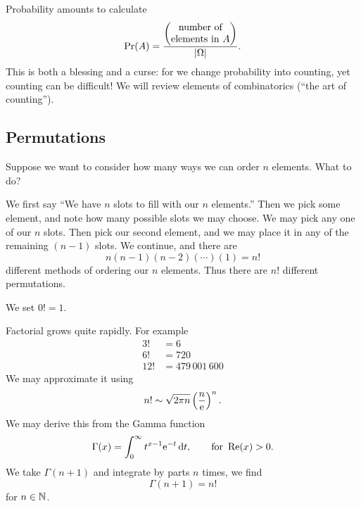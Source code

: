 \M
Probability amounts to calculate
\begin{equation}
\mathop{\mathrm{Pr}}\nolimits(A)=\frac{\begin{pmatrix}\mbox{number of}\\
\mbox{elements in $A$}
  \end{pmatrix}}{|\Omega|}.
\end{equation}
This is both a blessing and a curse: for we change probability into
counting, yet counting can be difficult! We will review elements of
combinatorics (``the art of counting'').

\subsection{Permutations}
\M
Suppose we want to consider how many ways we can order $n$
elements. What to do?

We first say ``We have $n$ slots to fill with our $n$ elements.'' Then
we pick some element, and note how many possible slots we may choose. We
may pick any one of our $n$ slots. Then pick our second element, and we
may place it in any of the remaining $(n-1)$ slots. We continue, and
there are 
\begin{equation}
n(n-1)(n-2)(\cdots)(1)=n!
\end{equation}
different methods of ordering our $n$ elements. Thus there are $n!$
different permutations.

 We set $0!=1$.

\M
Factorial grows quite rapidly. For example
\begin{subequations}
\begin{align}
3!&=6\\
6!&=720\\
12!&=479\,001\,600
\end{align}
\end{subequations}
We may approximate it using 
\begin{equation}
n!\sim\sqrt{2\pi n}\left(\frac{n}{\mathrm{e}}\right)^{n}.
\end{equation}
We may derive this from the Gamma function
\begin{equation}
\Gamma(x)=\int^{\infty}_{0}t^{x-1}\mathrm{e}^{-t}\,\mathrm{d} t,\qquad\mbox{for
}\mathop{\mathrm{Re}}\nolimits(x)>0.
\end{equation}
We take $\Gamma(n+1)$ and integrate by parts $n$ times, we find
\begin{equation}
\Gamma(n+1)=n!
\end{equation}
for $n\in\mathbb{N}$.

